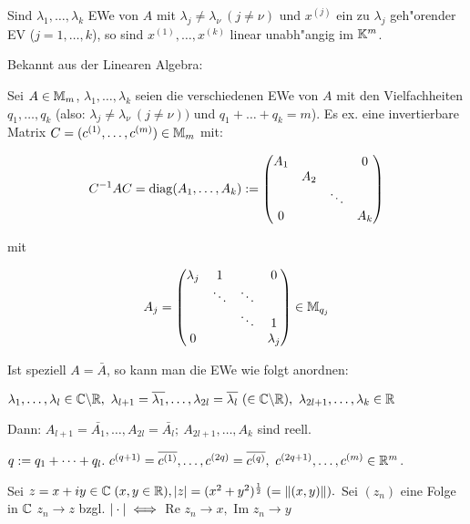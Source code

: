 \documentclass[a4paper,twoside,DIV15,BCOR12mm]{scrbook}
\begin{document}
Sind $\lambda_1,\ldots,\lambda_k$ EWe von $A$ mit $\lambda_j\ne\lambda_\nu\ (j\ne\nu)$ und $x^{(j)}$ ein zu $\lambda_j$ geh"orender EV ($j=1,\ldots,k$), so sind $x^{(1)},\ldots,x^{(k)}$ linear unabh"angig im $\mathbb{K}^m$.

Bekannt aus der Linearen Algebra:

\begin{satz}
Sei $A\in\mathbb{M}_m$, $\lambda_1,\ldots,\lambda_k$ seien die verschiedenen EWe von $A$ mit den Vielfachheiten $q_1,\ldots,q_k$ (also: $\lambda_j \ne \lambda_\nu\ (j\ne\nu))$ und $q_1+\ldots+q_k = m$). Es ex. eine invertierbare Matrix $C=(c^{(1)},\ldots,c^{(m)})\in\mathbb{M}_m$ mit:

$$C^{-1}AC = \mathop{\mathrm{diag}}\nolimits(A_1,\ldots,A_k) := \begin{pmatrix}
A_1 &     &        & 0\\
    & A_2 &        &\\
    &     & \ddots &\\
0   &     &        & A_k
\end{pmatrix}$$

mit 

$$A_j = \begin{pmatrix}
\lambda_j & 1 & & 0\\
   & \ddots & \ddots &\\
   &        & \ddots & 1\\
 0 &        &        & \lambda_j
\end{pmatrix} \in \mathbb{M}_{q_j}$$
\end{satz}

Ist speziell $A=\bar{A}$, so kann man die EWe wie folgt anordnen:

$\lambda_1,\ldots,\lambda_l\in\MdC\backslash\MdR,\ \lambda_{l+1} = \overline{\lambda_1},\ldots,\lambda_{2l} = \overline{\lambda_l}\ (\in\MdC\backslash\MdR),\ \lambda_{2l+1},\ldots,\lambda_k\in\MdR$

Dann: $A_{l+1} = \bar{A_1},\ldots,A_{2l}=\bar{A_l};\ A_{2l+1},\ldots,A_k$ sind reell.

$q:=q_1+\cdots+q_l.\ c^{(q+1)} = \overline{c^{(1)}},\ldots,c^{(2q)} = \overline{c^{(q)}},\ c^{(2q+1)},\ldots,c^{(m)}\in\MdR^m$.

\begin{definition}
Sei $z = x + iy \in \mathbb{C} \; (x, y \in \mathbb{R}), |z| = (x^2 + y^2)^\frac{1}{2} \; (= \|(x,y)\|).$ Sei $(z_n)$ eine Folge in $\mathbb{C}$ $z_n \rightarrow z$ bzgl. $|\cdot| \iff$ Re $z_n \rightarrow x,$ Im $z_n \rightarrow y$
\end{definition}
\end{document}
